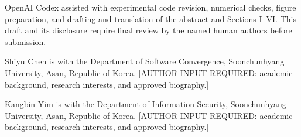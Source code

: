 \documentclass{ieeeaccess}
\begin{document}
OpenAI Codex assisted with experimental code revision, numerical checks,
figure preparation, and drafting and translation of the abstract and
Sections I--VI. This draft and its disclosure require final review by
the named human authors before submission.


\begin{IEEEbiographynophoto}{Shiyu Chen}
is with the Department of Software Convergence, Soonchunhyang University, Asan, Republic of Korea. [AUTHOR INPUT REQUIRED: academic background, research interests, and approved biography.]
\end{IEEEbiographynophoto}
\begin{IEEEbiographynophoto}{Kangbin Yim}
is with the Department of Information Security, Soonchunhyang University, Asan, Republic of Korea. [AUTHOR INPUT REQUIRED: academic background, research interests, and approved biography.]
\end{IEEEbiographynophoto}
\EOD
\end{document}
